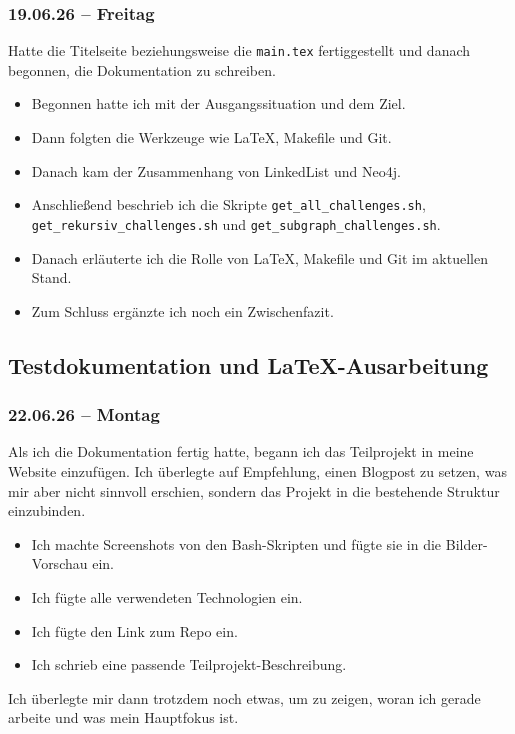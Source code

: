 \subsubsection{19.06.26 -- Freitag}

Hatte die Titelseite beziehungsweise die \texttt{main.tex} fertiggestellt und danach begonnen, die Dokumentation zu schreiben.

\begin{itemize}[itemsep=2pt, topsep=4pt]
    \item Begonnen hatte ich mit der Ausgangssituation und dem Ziel.
    \item Dann folgten die Werkzeuge wie \LaTeX, Makefile und Git.
    \item Danach kam der Zusammenhang von LinkedList und Neo4j.
    \item Anschließend beschrieb ich die Skripte \texttt{get\_all\_challenges.sh}, \texttt{get\_rekursiv\_challenges.sh} und \texttt{get\_subgraph\_challenges.sh}.
    \item Danach erläuterte ich die Rolle von \LaTeX, Makefile und Git im aktuellen Stand.
    \item Zum Schluss ergänzte ich noch ein Zwischenfazit.
\end{itemize}

\subsection{Testdokumentation und LaTeX-Ausarbeitung}
\subsubsection{22.06.26 -- Montag}

Als ich die Dokumentation fertig hatte, begann ich das Teilprojekt in meine Website einzufügen.
Ich überlegte auf Empfehlung, einen Blogpost zu setzen, was mir aber nicht sinnvoll erschien, sondern das Projekt in die bestehende Struktur einzubinden.

\begin{itemize}
    \item Ich machte Screenshots von den Bash-Skripten und fügte sie in die Bilder-Vorschau ein.
    \item Ich fügte alle verwendeten Technologien ein.
    \item Ich fügte den Link zum Repo ein.
    \item Ich schrieb eine passende Teilprojekt-Beschreibung.
\end{itemize}
Ich überlegte mir dann trotzdem noch etwas, um zu zeigen, woran ich gerade arbeite und was mein Hauptfokus ist.

